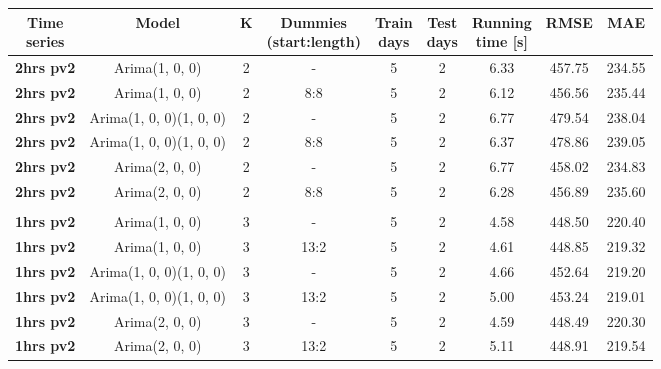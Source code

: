 \documentclass[12pt,a4paper,titlepage]{report}
\begin{document}
\begin{appendices}
\begin{table}[h]
    \begin{tabular}{|c|c|c|c|c|c|c|c|c|}
        \hline
        \makecell{\textbf{Time} \\ \textbf{series}} & \textbf{Model}          & \textbf{K} & \makecell{\textbf{Dummies} \\ \textbf{(start:length)}} & \makecell{\textbf{Train} \\ \textbf{days}} & \makecell{\textbf{Test}\\ \textbf{days}} & \makecell{\textbf{Running} \\ \textbf{time {[}s{]}}} & \textbf{RMSE} & \textbf{MAE} \\ \hline
        \textbf{2hrs pv2} & Arima(1, 0, 0)          & 2 & -    & 5 & 2 & 6.33     & 457.75 & 234.55 \\ \hline
        \textbf{2hrs pv2} & Arima(1, 0, 0)          & 2 & 8:8  & 5 & 2 & 6.12     & 456.56 & 235.44 \\ \hline
        \textbf{2hrs pv2} & Arima(1, 0, 0)(1, 0, 0) & 2 & -    & 5 & 2 & 6.77     & 479.54 & 238.04 \\ \hline
        \textbf{2hrs pv2} & Arima(1, 0, 0)(1, 0, 0) & 2 & 8:8  & 5 & 2 & 6.37     & 478.86 & 239.05 \\ \hline
        \textbf{2hrs pv2} & Arima(2, 0, 0)          & 2 & -    & 5 & 2 & 6.77     & 458.02 & 234.83 \\ \hline
        \textbf{2hrs pv2} & Arima(2, 0, 0)          & 2 & 8:8  & 5 & 2 & 6.28     & 456.89 & 235.60 \\ \hline
        \textbf{}         &                         &   &      &   &   &          &        &        \\ \hline
        \textbf{1hrs pv2} & Arima(1, 0, 0)          & 3 & -    & 5 & 2 & 4.58     & 448.50 & 220.40 \\ \hline
        \textbf{1hrs pv2} & Arima(1, 0, 0)          & 3 & 13:2 & 5 & 2 & 4.61     & 448.85 & 219.32 \\ \hline
        \textbf{1hrs pv2} & Arima(1, 0, 0)(1, 0, 0) & 3 & -    & 5 & 2 & 4.66     & 452.64 & 219.20 \\ \hline
        \textbf{1hrs pv2} & Arima(1, 0, 0)(1, 0, 0) & 3 & 13:2 & 5 & 2 & 5.00     & 453.24 & 219.01 \\ \hline
        \textbf{1hrs pv2} & Arima(2, 0, 0)          & 3 & -    & 5 & 2 & 4.59     & 448.49 & 220.30 \\ \hline
        \textbf{1hrs pv2} & Arima(2, 0, 0)          & 3 & 13:2 & 5 & 2 & 5.11     & 448.91 & 219.54 \\ \hline

\end{tabular}
\end{table}
\end{appendices}
\end{document}
